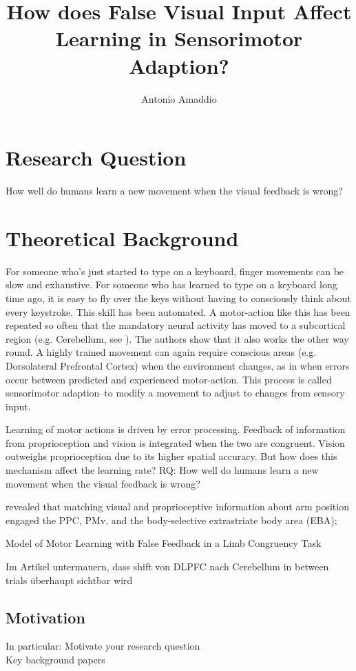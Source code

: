 \documentclass[man]{apa7}
\title{How does False Visual Input Affect Learning in Sensorimotor Adaption?}
\author{Antonio Amaddio}
\affiliation{Freie Universität Berlin \\ Decision Neuroscience, Winter 2022/23, Supervisor: Dr. Rasmus Bruckner}
\begin{document}
\maketitle


\section{Research Question}

How well do humans learn a new movement when the visual feedback is wrong?

\section{Theoretical Background}

For someone who's just started to type on a keyboard, finger movements can be slow and exhaustive. For someone who has learned to type on a keyboard long time ago, it is easy to fly over the keys without having to consciously think about every keystroke. This skill has been automated. A motor-action like this has been repeated so often that the mandatory neural activity has moved to a subcortical region (e.g. Cerebellum, see \cite{seidler2013motor}). The authors show that it also works the other way round. A highly trained movement can again require conscious areas (e.g. Dorsolateral Prefrontal Cortex) when the environment changes, as in when errors occur between predicted and experienced motor-action. This process is called sensorimotor adaption–to modify a movement to adjust to changes from sensory input.


Learning of motor actions is driven by error processing. Feedback of information from proprioception and vision is integrated when the two are congruent.
Vision outweighs proprioception due to its higher spatial accuracy. But how does this mechanism affect the learning rate?
RQ: How well do humans learn a new movement when the visual feedback is wrong?


revealed that matching visual and proprioceptive information about arm position engaged the PPC, PMv, and the body-selective extrastriate body area (EBA);

Model of Motor Learning with False Feedback in a Limb Congruency Task

Im Artikel untermauern, dass shift von DLPFC nach Cerebellum in between trials überhaupt sichtbar wird

\subsection{Motivation}
In particular: Motivate your research question \\
Key background papers
\cite{Limanowski2016}
\cite{seidler2013motor}
\end{document}
